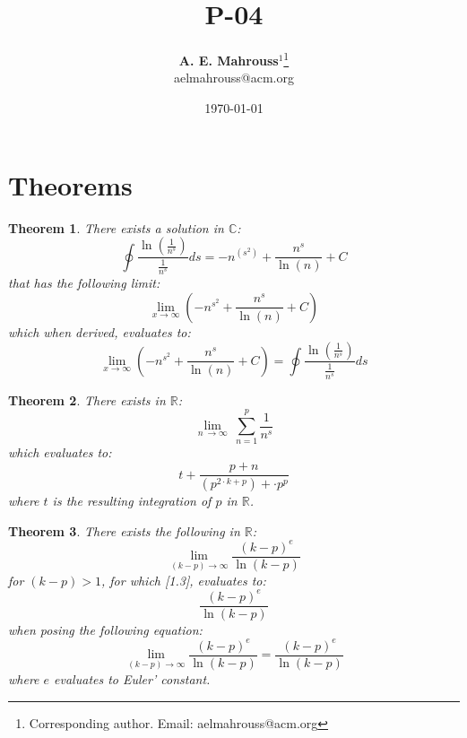 \documentclass[10pt, twocolumn]{article}
\title{%
  \vspace{-1.5em}%
  \large\textbf{P-04}%
}
\author{%
  \textbf{A. E. Mahrouss}$^{1}$\thanks{Corresponding author. Email: aelmahrouss@acm.org}
  \\aelmahrouss@acm.org\\[0.4em]
}
\date{%
  \small \today
}
\theoremstyle{plain}
\newtheorem{theorem}{Theorem}[section]
\theoremstyle{definition}
\theoremstyle{remark}
\begin{document}

\twocolumn[{%
  \maketitle
  \vspace{-0.5em}
  \vspace{0.8em}
  \rule{\linewidth}{0.4pt}
  \vspace{1em}
}]


\section{Theorems}
\begin{theorem}
  There exists a solution in $\mathbb{C}$:
  \begin{equation}
    \oint \frac{\ln(\frac{1}{n^s})}{\frac{1}{n^s}}ds = -n^{(s^2)}+\frac{n^s}{\ln \left(n\right)}+C
  \end{equation}
  that has the following limit:
  \begin{equation}
    \lim _{x\to \infty }\left(-n^{s^2}+\frac{n^s}{\ln \left(n\right)}+C\right)
  \end{equation}
  which when derived, evaluates to:
  \begin{equation}
    \lim _{x\to \infty }\left(-n^{s^2}+\frac{n^s}{\ln \left(n\right)}+C\right) = \oint \frac{\ln(\frac{1}{n^s})}{\frac{1}{n^s}}ds
  \end{equation}
\end{theorem}

\begin{theorem}
  There exists in $\mathbb{R}$:
  \begin{equation}
    \lim _{n\:\to \infty }\:\sum_{n=1}^{p} \frac{1}{n^s}
  \end{equation}
  which evaluates to:
  \begin{equation}
    t + \frac{p+n}{(p^{2 \cdot k+p}) + \cdot p^{p}}
  \end{equation}
  where $t$ is the resulting integration of $p$ in $\mathbb{R}$.
\end{theorem}

\begin{theorem}
  There exists the following in $\mathbb{R}$:
  \begin{equation}
    \lim _{\left(k-p\right)\to \infty } \frac{(k-p)^{e}}{\ln(k-p)}
  \end{equation}
  for $(k-p) > 1$, for which [1.3], evaluates to:
  \begin{equation}
    \frac{(k-p)^{e}}{\ln(k-p)}
  \end{equation}
  when posing the following equation:
  \begin{equation}
    \lim _{\left(k-p\right)\to \infty } \frac{(k-p)^{e}}{\ln(k-p)} = \frac{(k-p)^{e}}{\ln(k-p)}
  \end{equation}
  where $e$ evaluates to Euler' constant.
\end{theorem}
\end{document}
